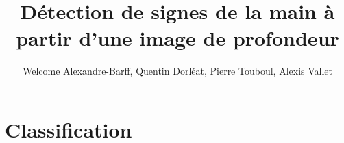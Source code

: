 \documentclass{article}
\title{Détection de signes de la main à partir d'une image de profondeur}
\author{Welcome Alexandre-Barff, Quentin Dorléat, Pierre Touboul, Alexis Vallet}
\begin{document}
\maketitle
\tableofcontents







\section{Classification}














\end{document}
